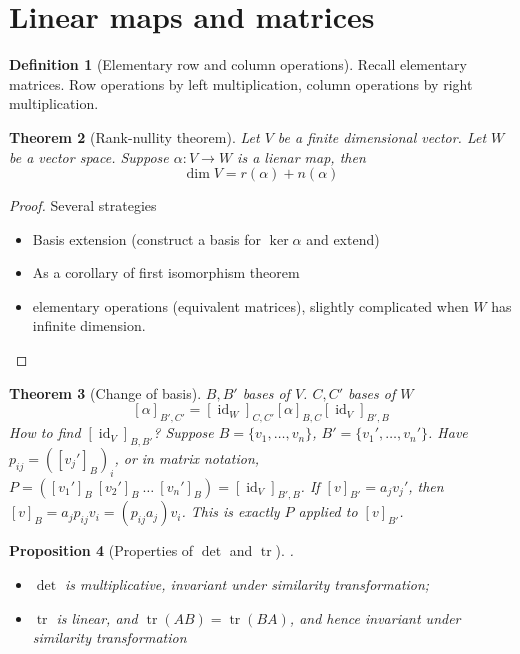 \documentclass{article}
\theoremstyle{definition}
\newtheorem{defn}{Definition}[section]
\theoremstyle{remark}
\theoremstyle{plain}
\newtheorem{thm}[defn]{Theorem}
\newtheorem{prop}[defn]{Proposition}
\begin{document}
\section{Linear maps and matrices}
\begin{defn}[Elementary row and column operations]
    Recall elementary matrices. Row operations by left multiplication, column operations by right multiplication.
\end{defn}
\begin{thm}[Rank-nullity theorem]
    Let $V$ be a finite dimensional vector. Let $W$ be a vector space. Suppose $\alpha:V\to W$ is a lienar map, then    \[\dim V= r(\alpha)+n(\alpha)\]
\end{thm}
\begin{proof}
    Several strategies
    \begin{itemize}
        \item Basis extension (construct a basis for $\ker\alpha$ and extend)
        \item As a corollary of first isomorphism theorem
        \item elementary operations (equivalent matrices), slightly complicated when $W$ has infinite dimension.
    \end{itemize}
\end{proof}
\begin{thm}[Change of basis]
    $B, B'$ bases of $V$. $C, C'$ bases of $W$
    \[[\alpha]_{B',C'}=[\operatorname{id}_W]_{C,C'}[\alpha]_{B,C}[\operatorname{id}_V]_{B',B}\]
    How to find $[\operatorname{id}_V]_{B,B'}$? Suppose $B=\{v_1,\ldots,v_n\}$, $B'=\{v_1',\ldots,v_n'\}$. 
    Have $p_{ij}=([v_j']_{B})_i$, or in matrix notation, $P=([v_1']_B\ [v_2']_B\ \ldots\ [v_n']_B)=[\operatorname{id}_V]_{B',B}$. If $[v]_{B'}=a_jv_j'$, then $[v]_B=a_jp_{ij}v_i=(p_{ij}a_j)v_i$. This is exactly $P$ applied to $[v]_{B'}$.
\end{thm}
\begin{prop}[Properties of $\det$ and $\operatorname{tr}$].\\
\begin{itemize}
    \item $\det$ is multiplicative, invariant under similarity transformation;
    \item $\operatorname{tr}$ is linear, and $\operatorname{tr}(AB)=\operatorname{tr}(BA)$, and hence invariant under similarity transformation
\end{itemize}
\end{prop}
\end{document}
